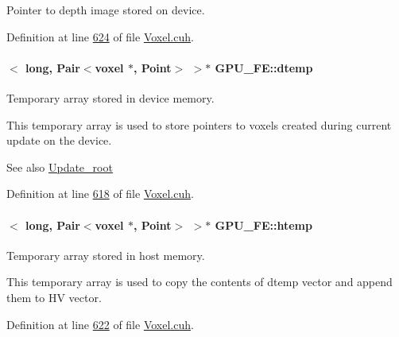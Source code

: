 Pointer to depth image stored on device. 



Definition at line \hyperlink{Voxel_8cuh_source_l00624}{624} of file \hyperlink{Voxel_8cuh_source}{Voxel.\+cuh}.

\paragraph[{\texorpdfstring{dtemp}{dtemp}}]{$<$ long, {\bf Pair}$<${\bf voxel} $\ast$, {\bf Point}$>$ $>$$\ast$ G\+P\+U\+\_\+\+F\+E\+::dtemp\hspace{0.3cm}{\ttfamily [private]}}\hypertarget{classGPU__FE_a15cab1132ca16d50844a60cc09235567}{}\label{classGPU__FE_a15cab1132ca16d50844a60cc09235567}


Temporary array stored in device memory. 

This temporary array is used to store pointers to voxels created during current update on the device. \begin{DoxySeeAlso}{See also}
\hyperlink{Voxel_8cuh_a935fc0c42796b23607cf6f81a1e95e8d}{Update\+\_\+root} 
\end{DoxySeeAlso}


Definition at line \hyperlink{Voxel_8cuh_source_l00618}{618} of file \hyperlink{Voxel_8cuh_source}{Voxel.\+cuh}.

\paragraph[{\texorpdfstring{htemp}{htemp}}]{$<$ long, {\bf Pair}$<${\bf voxel} $\ast$, {\bf Point}$>$ $>$$\ast$ G\+P\+U\+\_\+\+F\+E\+::htemp\hspace{0.3cm}{\ttfamily [private]}}\hypertarget{classGPU__FE_afd39eabc36a87a6cde62b57296efcc8a}{}\label{classGPU__FE_afd39eabc36a87a6cde62b57296efcc8a}


Temporary array stored in host memory. 

This temporary array is used to copy the contents of dtemp vector and append them to HV vector. 

Definition at line \hyperlink{Voxel_8cuh_source_l00622}{622} of file \hyperlink{Voxel_8cuh_source}{Voxel.\+cuh}.

